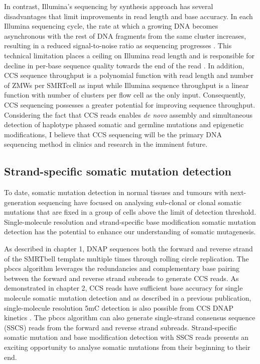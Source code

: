 In contrast, Illumina’s sequencing by synthesis approach has several disadvantages that limit improvements in read length and base accuracy. In each Illumina sequencing cycle, the rate at which a growing DNA becomes asynchronous with the rest of DNA fragments from the same cluster increases, resulting in a reduced signal-to-noise ratio as sequencing progresses \cite{}. This technical limitation places a ceiling on Illumina read length and is responsible for decline in per-base sequence quality towards the end of the read \cite{}. In addition, CCS sequence throughput is a polynomial function with read length and number of ZMWs per SMRTcell as input while Illumina sequence throughput is a linear function with number of clusters per flow cell as the only input. Consequently, CCS sequencing possesses a greater potential for improving sequence throughput. Considering the fact that CCS reads enables \textit{de novo} assembly and simultaneous detection of haplotype phased somatic and germline mutations and epigenetic modifications, I believe that CCS sequencing will be the primary DNA sequencing method in clinics and research in the imminent future. 




\subsection{Strand-specific somatic mutation detection}

To date, somatic mutation detection in normal tissues and tumours with next-generation sequencing have focused on analysing sub-clonal or clonal somatic mutations that are fixed in a group of cells above the limit of detection threshold. Single-molecule resolution and strand-specific base modification somatic mutation detection has the potential to enhance our understanding of somatic mutagenesis.

As described in chapter 1, DNAP sequences both the forward and reverse strand of the SMRTbell template multiple times through rolling circle replication. The pbccs algorithm leverages the redundancies and complementary base pairing between the forward and reverse strand subreads to generate CCS reads. As demonstrated in chapter 2, CCS reads have sufficient base accuracy for single molecule somatic mutation detection and as described in a previous publication, single-molecule resolution 5mC detection is also possible from CCS DNAP kinetics \cite{Vong2019-bi, Tse2021-or}. The pbccs algorithm can also generate single-strand consensus sequence (SSCS) reads from the forward and reverse strand subreads. Strand-specific somatic mutation and base modification detection with SSCS reads presents an exciting opportunity to analyse somatic mutations from their beginning to their end. 

